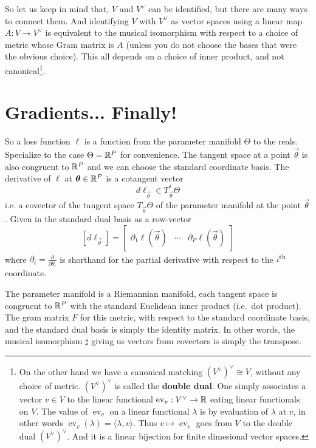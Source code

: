 \documentclass[12pt]{amsart}
\begin{document}
So let us keep in mind that, $V$ and $V^\vee$ can be identified, but there are many ways to connect them. And identifying $V$ with $V^\vee$ as vector spaces using a linear map $A :  V \to V^\vee$ is equivalent to the musical isomorphism with respect to a choice of metric whose Gram matrix is $A$ (unless you do not choose the bases that were the obvious choice). This all depends on a choice of inner product, and not canonical\footnote{
On the other hand we have a canonical matching $(V^\vee)^\vee \cong V$, without any choice of metric. $(V^\vee)^\vee$ is called the {\bf double dual}. One simply associates a vector $v \in V$ to the linear functional $\operatorname{ev}_v: V^\vee \to \mathbb{R}$ eating linear functionals on $V$. The value of $\operatorname{ev}_v$ on a linear functional $\lambda$ is by evaluation of $\lambda$ at $v$, in other words $\operatorname{ev}_v(\lambda) = \langle \lambda, v\rangle$. Thus $v \mapsto \operatorname{ev}_v$ goes from $V$ to the double dual $(V^\vee)^\vee$. And it is a linear bijection for finite dimesional vector spaces.}.


\section*{Gradients... Finally!}

So a loss function $\ell$ is a function from the parameter manifold $\Theta$ to the reals. Specialize to the case $\Theta = \mathbb{R}^P$ for convenience. The tangent space at a point $\vec{\theta}$ is also congruent to $\mathbb{R}^P$ and we can choose the standard coordinate basis. The derivative of $\ell$ at $\mathbf{\boldsymbol{\theta}} \in \mathbb{R}^P$ is a cotangent vector 
\[
	d\ell_{\vec{\theta}} \in T_{\vec{\theta}}^*\Theta
\]
i.e. a covector of the tangent space $T_{\vec{\theta}}\Theta$ of the parameter manifold at the point $\vec{\theta}$. Given in the standard dual basis as a row-vector
\[
	[d\ell_{\vec{\theta}}]  = \begin{bmatrix}
	\partial_1 \ell (\vec{\theta}) & \cdots & \partial_P \ell(\vec{\theta})
	\end{bmatrix}
\]
where $\partial_i= \frac{\partial}{\partial \theta_i}$ is shorthand for the partial derivative with respect to the $i$\textsuperscript{th} coordinate.

The parameter manifold is a Riemannian manifold, each tangent space is congruent to $\mathbb{R}^P$ with the standard Euclidean inner product (i.e.\ dot product). The gram matrix $F$ for this metric, with respect to the standard coordinate basis, and the standard dual basis is simply the identity matrix. In other words, the musical isomorphism $\sharp$ giving us vectors from covectors is simply the transpose.
\end{document}

